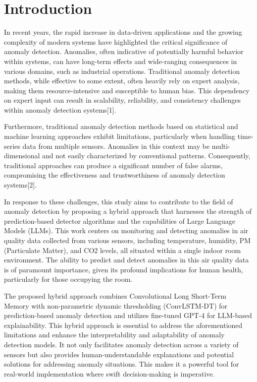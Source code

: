 \documentclass[final,3p,times,twocolumn]{elsarticle}
\begin{document}

\section{Introduction}\label{sec1}
In recent years, the rapid increase in data-driven applications and the growing complexity of modern systems have highlighted the critical significance of anomaly detection. Anomalies, often indicative of potentially harmful behavior within systems, can have long-term effects and wide-ranging consequences in various domains, such as industrial operations. Traditional anomaly detection methods, while effective to some extent, often heavily rely on expert analysis, making them resource-intensive and susceptible to human bias. This dependency on expert input can result in scalability, reliability, and consistency challenges within anomaly detection systems[1].

Furthermore, traditional anomaly detection methods based on statistical and machine learning approaches exhibit limitations, particularly when handling time-series data from multiple sensors. Anomalies in this context may be multi-dimensional and not easily characterized by conventional patterns. Consequently, traditional approaches can produce a significant number of false alarms, compromising the effectiveness and trustworthiness of anomaly detection systems[2].

In response to these challenges, this study aims to contribute to the field of anomaly detection by proposing a hybrid approach that harnesses the strength of prediction-based detector algorithms and the capabilities of Large Language Models (LLMs). This work centers on monitoring and detecting anomalies in air quality data collected from various sensors, including temperature, humidity, PM (Particulate Matter), and CO2 levels, all situated within a single indoor room environment. The ability to predict and detect anomalies in this air quality data is of paramount importance, given its profound implications for human health, particularly for those occupying the room.

The proposed hybrid approach combines Convolutional Long Short-Term Memory with non-parametric dynamic thresholding (ConvLSTM-DT) for prediction-based anomaly detection and utilizes fine-tuned GPT-4 for LLM-based explainability. This hybrid approach is essential to address the aforementioned limitations and enhance the interpretability and adaptability of anomaly detection models. It not only facilitates anomaly detection across a variety of sensors but also provides human-understandable explanations and potential solutions for addressing anomaly situations. This makes it a powerful tool for real-world implementation where swift decision-making is imperative.
\end{document}
